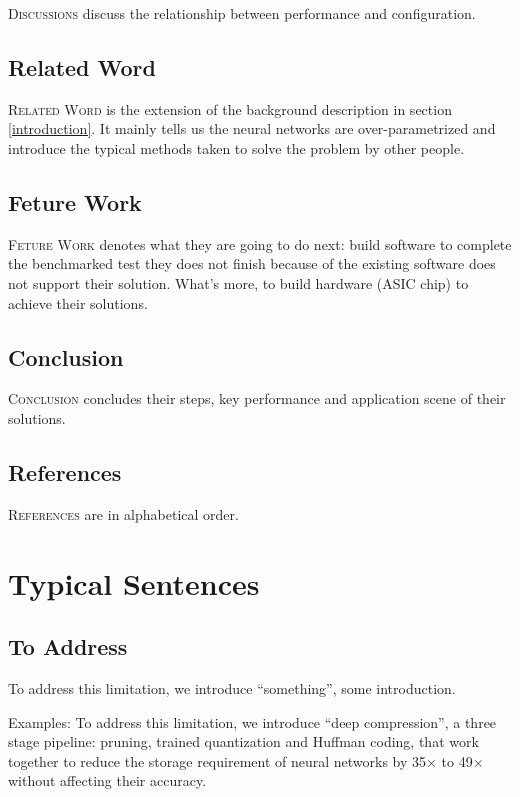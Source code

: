\documentclass{article} %
\begin{document}
\textsc{Discussions} discuss the relationship between performance and 
configuration.

\subsection{Related Word} 

\textsc{Related Word} is the extension of the background description in 
section \ref{introduction}. It mainly tells us the neural networks are over-parametrized 
and introduce the typical methods taken to solve the problem by other people. 

\subsection{Feture Work} 

\textsc{Feture Work} denotes what they are going to do next: build software 
to complete the benchmarked test they does not finish because of the existing software 
does not support their solution. What's more, to build hardware (ASIC chip) to achieve 
their solutions.

\subsection{Conclusion} 

\textsc{Conclusion} concludes their steps, key performance and application 
scene of their solutions.

\subsection{References} 

\textsc{References} are in alphabetical order.

\section{Typical Sentences}

\subsection{To Address}

To address this limitation, we introduce “something”, some introduction.

Examples: To
address this limitation, we introduce “deep compression”, a three stage pipeline:
pruning, trained quantization and Huffman coding, that work together to reduce
the storage requirement of neural networks by 35× to 49× without affecting their
accuracy.
\end{document}
